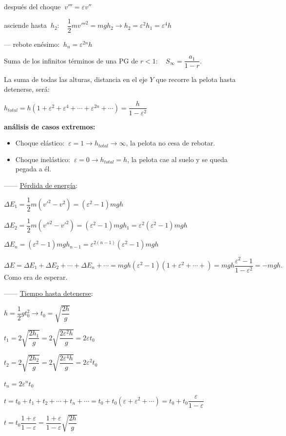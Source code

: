 después del choque $\ v'''=\varepsilon v''$

asciende hasta $\ h_2:\quad \dfrac 1 2 m {v'''}^2=mgh_2 \to h_2=\varepsilon^2 h_1=\varepsilon^4 h$

--- rebote enésimo: $\ h_n=\varepsilon^{2n} h$

\textcolor{gris}{Suma de los infinitos términos de una PG de $r<1:\quad S_{\infty}=\dfrac{a_1}{1-r}$.}

La suma de todas las alturas, distancia en el eje $Y$ que recorre la pelota hasta detenerse, será:

$h_{total}=h(1+\varepsilon^2+\varepsilon^4+\cdots +\varepsilon^{2n}+\cdots )=\dfrac {h}{1-\varepsilon^2}$

\textbf{análisis de casos extremos:}

\begin{itemize}
\item Choque elástico: $\ \varepsilon=1 \to h_{total}\to \infty$, la pelota no cesa de rebotar.
\item Choque inelástico: $\ \varepsilon=0\to h_{total}=h$, la pelota cae al suelo y se queda pegada a él.	
\end{itemize}

------ \underline{Pérdida de energía}:

$\Delta E_1=\dfrac 1 2 m (v'^2-v^2)=(\varepsilon^2-1)mgh$

$\Delta E_2=\dfrac 1 2 m (v''^2-v'^2)=(\varepsilon^2-1)mgh_1= \varepsilon^2(\varepsilon^2-1)mgh$

$\Delta E_n=(\varepsilon^2-1)mgh_{n-1}=\varepsilon^{2(n-1)}(\varepsilon^2-1)mgh$

$\Delta E=\Delta E_1+\Delta E_2+ \cdots + \Delta E_n+\cdots =mgh(\varepsilon^2-1)(1+\varepsilon^2+\cdots + )=mgh\dfrac{\varepsilon^2-1}{1-\varepsilon^2}=-mgh.\quad $Como era de esperar.

------ \underline{Tiempo hasta detenerse}:

$h=\dfrac 1 2 gt_0^2 \to t_0=\sqrt{\dfrac {2h}{g}}$

$t_1=2 \sqrt{\dfrac{2h_1}{g}}=2\sqrt{\dfrac{2\varepsilon^2 h}{g}}=2\varepsilon t_0$

$t_2=2\sqrt{\dfrac{2h_2}{g}}=2\sqrt{\dfrac{2\varepsilon^4h}{g}}=2\varepsilon^2 t_0$

$t_n=2\varepsilon^n t_0$

$t=t_0+t_1+t_2+ \cdots + t_n+\cdots =t_0+t_0(\varepsilon+\varepsilon^2+\cdots )=t_0+t_0 \dfrac{\varepsilon}{1-\varepsilon}$

$t=t_0\dfrac{1+\varepsilon}{1-\varepsilon}=\dfrac{1+\varepsilon}{1-\varepsilon} \sqrt{\dfrac{2h}{g}}$

